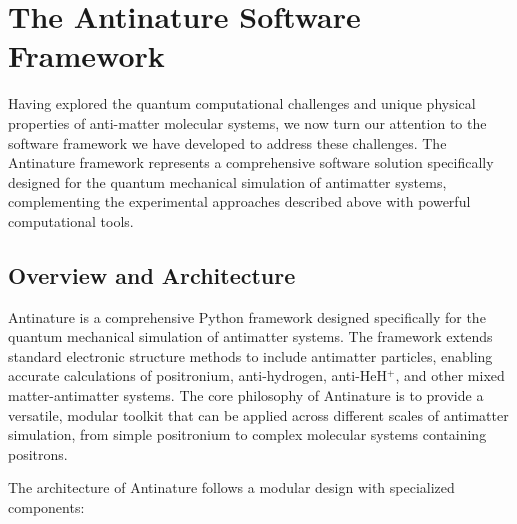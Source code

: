 \documentclass[10pt,twocolumn,a4paper]{article}
\begin{document}
\section{The Antinature Software Framework}

Having explored the quantum computational challenges and unique physical properties of anti-matter molecular systems, we now turn our attention to the software framework we have developed to address these challenges. The Antinature framework represents a comprehensive software solution specifically designed for the quantum mechanical simulation of antimatter systems, complementing the experimental approaches described above with powerful computational tools.

\subsection{Overview and Architecture}
Antinature is a comprehensive Python framework designed specifically for the quantum mechanical simulation of antimatter systems. The framework extends standard electronic structure methods to include antimatter particles, enabling accurate calculations of positronium, anti-hydrogen, anti-HeH$^+$, and other mixed matter-antimatter systems. The core philosophy of Antinature is to provide a versatile, modular toolkit that can be applied across different scales of antimatter simulation, from simple positronium to complex molecular systems containing positrons.

The architecture of Antinature follows a modular design with specialized components:
\end{document}
